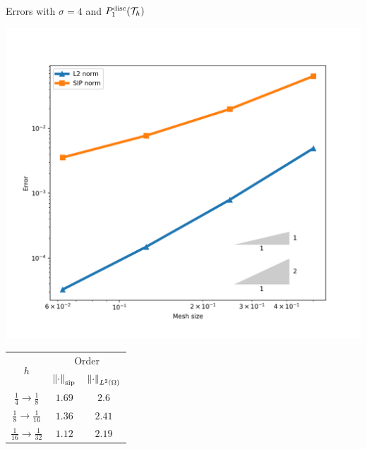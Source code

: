 		\begin{frame}{Errors with $\sigma=4$ and $\relax{P}^{\text{disc}}_1(\mathcal{T}_h)$}
		\begin{minipage}{0.50\textwidth}
			\centering
			\includegraphics[scale=0.30]{img/Difusion/errores_difusion_P1dc.png}
		\end{minipage}
		\begin{minipage}{0.49\textwidth}
			\centering
			\begin{tabular}{|c|c|c|}
				\hline 
				\multirow{2}{*}{$h$} & \multicolumn{2}{c|}{Order} \\
				\cline{2-3}
				&  $\left\|\cdot\right\|_{\text{sip}}$ & $\left\|\cdot\right\|_{L^2(\Omega)}$ \\ 
				\hline
				\hline
				$\frac{1}{4}\to\frac{1}{8}$ & $1.69$ & $2.6$ \\ 
				\hline 
				$\frac{1}{8}\to\frac{1}{16}$ & $1.36$ & $2.41$ \\ 
				\hline 
				$\frac{1}{16}\to\frac{1}{32}$ & $1.12$ & $2.19$\\
				\hline
			\end{tabular}
		\end{minipage}
		\end{frame}
		
